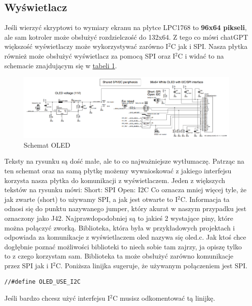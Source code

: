 \documentclass[11pt]{article}
\begin{document}
\subsection{Wyświetlacz}
Jeśli wierzyć skryptowi to wymiary ekranu na płytce LPC1768 to \textbf{96x64 pikseli},
ale sam kotroler może obsłużyć rozdzielczość do 132x64. Z tego co mówi chatGPT 
większość wyświetlaczy może wykorzystywać zarówno I$^2$C jak i SPI. Nasza płytka 
również może obsłużyć wyświetlacz za pomocą SPI oraz I$^2$C i widać to na schemacie znajdującym
się w \hyperref[tab:tab1]{tabeli 1}.
\begin{figure}[H]
    \includegraphics[width=\textwidth]{OLED.png}
    \caption{Schemat OLED}
\end{figure}
Teksty na rysunku są dość małe, ale to co najważniejsze wytłumaczę. Patrząc na ten
schemat oraz na samą płytkę możemy wywnioskować z jakiego interfejsu korzysta nasza 
płytka do komunikacji z wyświetlaczem. Jeden z większych tekstów na rysunku mówi:\newline
Short: SPI \newline
Open: I2C \newline
Co oznacza mniej więcej tyle, że jak zwarte (short) to używamy SPI, a jak jest 
otwarte to I$^2$C. Informacja ta odnosi się do punktu nazywanego jumper, który 
akurat w naszym przypadku jest oznaczony jako J42. Najprawdopodobniej są to jakieś 2
wystające piny, które można połączyć zworką.
Biblioteka, która była w przykładowych projektach i odpowiada za komunikacje z 
wyświetlaczem oled nazywa się oled.c. Jak ktoś chce dogłębnie poznać możliwości
biblioteki to niech sobie tam zajrzy, ja opiszę tylko to z czego korzystam sam.
Biblioteka ta może obsłużyć zarówno komunikacje przez SPI jak i I$^2$C. \newline
Poniższa linijka sugeruje, że używanym połączeniem jest SPI.
\begin{lstlisting}
//#define OLED_USE_I2C
\end{lstlisting}
Jeśli bardzo chcesz użyć interfejsu I$^2$C musisz odkomentować tą linijkę.
\end{document}
